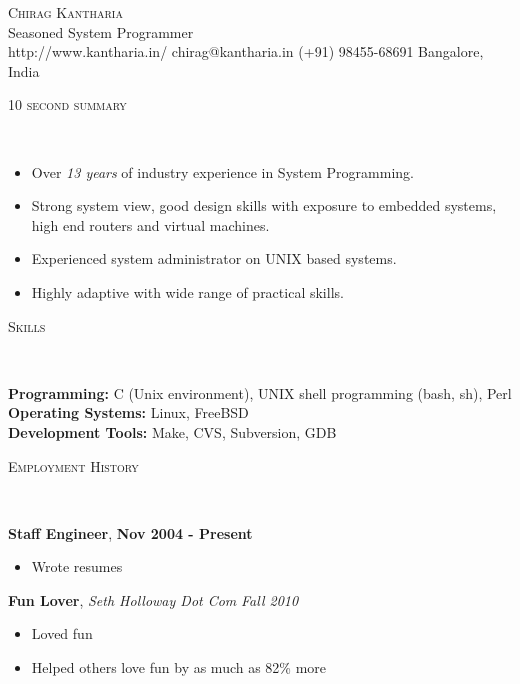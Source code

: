 \documentclass[9pt]{article}
\newenvironment{changemargin}[2]{%
  \begin{list}{}{%
    \setlength{\topsep}{0pt}%
    \setlength{\leftmargin}{#1}%
    \setlength{\rightmargin}{#2}%
    \setlength{\listparindent}{\parindent}%
    \setlength{\itemindent}{\parindent}%
    \setlength{\parsep}{\parskip}%
  }%
  \item[]}{\end{list}
}
\newcommand{\lineover}{
	\begin{changemargin}{-0.05in}{-0.05in}
		\vspace*{-8pt}
		\hrulefill \\
		\vspace*{-2pt}
	\end{changemargin}
}
\newcommand{\header}[1]{
	\begin{changemargin}{-0.5in}{-0.5in}
		\scshape{#1}\\
  	\lineover
	\end{changemargin}
}
\newcommand{\contact}[6]{
	\begin{changemargin}{-0.5in}{-0.5in}
		\begin{center}
			{\Large \scshape {#1}}\\ \smallskip
			{#2}\\ \smallskip 
			{#3} \hspace{0.5in}
			{#4} \hspace{0.5in}
			{#5} \hspace{0.5in}
			{#6} \hspace{0.5in}
		\end{center}
		\vspace*{20pt}
	\end{changemargin}
}
\newenvironment{body} {
	\vspace*{-16pt}
	\begin{changemargin}{-0.25in}{-0.5in}
  }	
	{\end{changemargin}
}
\begin{document}
\contact{Chirag Kantharia}{Seasoned System Programmer}{http://www.kantharia.in/}{chirag@kantharia.in}{(+91) 98455-68691} {Bangalore, India}

\header{10 second summary}

\begin{body}
	\vspace{14pt}
	\begin{itemize}
	\item Over \emph{13 years} of industry experience in System Programming.
	\item Strong system view, good design skills with exposure to embedded systems, high end routers and virtual machines.
	\item Experienced system administrator on UNIX based systems.
	\item Highly adaptive with wide range of practical skills.
	\end{itemize}
\end{body}

\smallskip


\header{Skills}

\begin{body}
	\vspace{14pt}
	{\textbf{Programming:}}{} C (Unix environment), UNIX shell programming (bash, sh), Perl\\
	\medskip
	{\textbf{Operating Systems:}}{} Linux, FreeBSD\\
	\medskip
	{\textbf{Development Tools:}}{} Make, CVS, Subversion, GDB\\
\end{body}

\smallskip



\header{Employment History}

\begin{body}
	\vspace{14pt}
	\textbf{Staff Engineer},  \hfill \bf{Nov 2004 - Present} \\
	\vspace*{-4pt}
	\begin{itemize} \itemsep -0pt  %
		\item Wrote resumes
	\end{itemize}

	\textbf {Fun Lover}, \emph{Seth Holloway Dot Com} \hfill \emph{Fall 2010}\\
	\vspace*{-4pt}
	\begin{itemize} \itemsep -0pt
		\item Loved fun
		\item Helped others love fun by as much as 82\% more
	\end{itemize}
\end{body}
\end{document}
